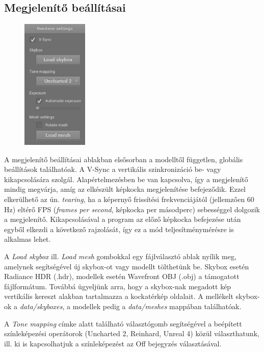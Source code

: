 \clearpage

\subsection{Megjelenítő beállításai}

\begin{figure}
    \vspace{-23pt}
    \includegraphics[width=0.28\textwidth]{images/renderer_settings.png}
    \vspace{-20pt}
\end{figure}

A megjelenítő beállításai ablakban elsősorban a modelltől független, globális beállítások találhatóak. A V-Sync a vertikális szinkronizáció be- vagy kikapcsolására szolgál. Alapértelmezésben be van kapcsolva, így a megjelenítő mindig megvárja, amíg az elkészült képkocka megjelenítése befejeződik. Ezzel elkerülhető az ún. \textit{tearing}, ha a képernyő frissítési frekvenciájától (jellemzően 60 Hz) eltérő FPS (\textit{frames per second}, képkocka per másodperc) sebességgel dolgozik a megjelenítő. Kikapcsolásával a program az előző képkocka befejezése után egyből elkezdi a következő rajzolását, így ez a mód teljesítménymérésre is alkalmas lehet.

A \textit{Load skybox} ill. \textit{Load mesh} gombokkal egy fájlválasztó ablak nyílik meg, amelynek segítségével új skybox-ot vagy modellt tölthetünk be. Skybox esetén Radiance HDR (.hdr), modellek esetén Wavefront OBJ (.obj) a támogatott fájlformátum. Továbbá ügyeljünk arra, hogy a skybox-nak megadott kép vertikális kereszt alakban tartalmazza a kockatérkép oldalait. A mellékelt skybox-ok a \textit{data/skyboxes}, a modellek pedig a \textit{data/meshes} mappában találhatóak.

A \textit{Tone mapping} címke alatt található választógomb segítségével a beépített színleképezési operátorok (Uncharted 2, Reinhard, Unreal 4) közül választhatunk, ill. ki is kapcsolhatjuk a színleképezést az Off bejegyzés választásával.

